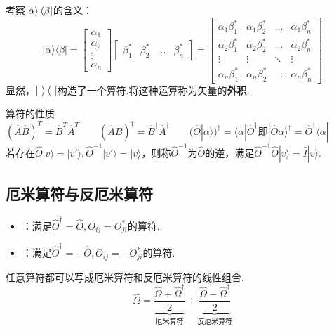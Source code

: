 考察$\ket{\alpha}\bra{\beta}$的含义：
\[
|\alpha\rangle \langle\beta| = \begin{bmatrix} \alpha_1 \\ \alpha_2 \\ \vdots \\ \alpha_n \end{bmatrix} \begin{bmatrix} \beta_1^* & \beta_2^* & \dots & \beta_n^* \end{bmatrix} = \begin{bmatrix} \alpha_1 \beta_1^* & \alpha_1 \beta_2^* & \dots & \alpha_1 \beta_n^* \\ \alpha_2 \beta_1^* & \alpha_2 \beta_2^* & \dots & \alpha_2 \beta_n^* \\ \vdots & \vdots & \ddots & \vdots \\ \alpha_n \beta_1^* & \alpha_n \beta_2^* & \dots & \alpha_n \beta_n^* \end{bmatrix}
\]
显然，$\ket{~}\bra{~}$构造了一个算符,将这种运算称为矢量的\textbf{外积}.
\begin{extension}{算符的性质}
    $(\hat{A} \hat{B})^T = \hat{B}^T \hat{A}^T \qquad (\hat{A} \hat{B})^\dagger = \hat{B}^\dagger \hat{A}^\dagger \qquad (\hat{O} |\alpha\rangle)^\dagger = \langle\alpha| \hat{O}^\dagger \text{即} |\hat{O} \alpha\rangle^\dagger = \hat{O}^\dagger \langle\alpha|$ \\
    若存在$\hat{O} |v\rangle = |v'\rangle,\hat{O}^{-1} |v'\rangle = |v\rangle$，则称$\hat{O}^{-1}$为$\hat{O}$的逆，满足$\hat{O}^{-1} \hat{O} |v\rangle = \hat{I} |v\rangle$.
\end{extension}

\subsection{厄米算符与反厄米算符}
\begin{definition}
    \begin{itemize}
        \item {}：满足$\hat{O}^{\dagger} = \hat{O},O_{ij} = O^*_{ji}$的算符.
        \item {}：满足$\hat{O}^{\dagger} = -\hat{O},O_{ij} = -O^*_{ji}$的算符.
    \end{itemize}
\end{definition}

\begin{theorem}
    任意算符都可以写成厄米算符和反厄米算符的线性组合.
    \[\hat{\Omega} = \underbrace{\frac{\hat{\Omega}+\hat{\Omega}^{\dagger}}{2}}_{\text{厄米算符}} + \underbrace{\frac{\hat{\Omega}-\hat{\Omega}^{\dagger}}{2}}_{\text{反厄米算符}} \]
\end{theorem}


